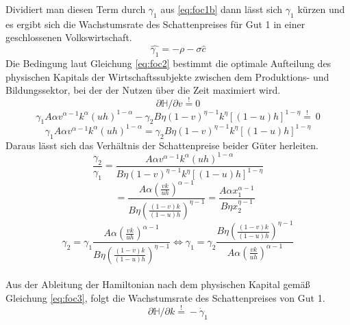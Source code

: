 Dividiert man diesen Term durch $\gamma_1$ aus \eqref{eq:foc1b} dann lässt sich $\gamma_1$ kürzen und es ergibt sich die Wachstumsrate des Schattenpreises für Gut 1 in einer geschlossenen Volkswirtschaft.
\begin{equation}
\hat{\gamma_1}=-\rho-\sigma\hat{c}\label{eq:foc1d}
\end{equation}
Die Bedingung laut Gleichung \eqref{eq:foc2} bestimmt die optimale Aufteilung des physischen Kapitals der Wirtschaftssubjekte zwischen dem Produktions- und Bildungssektor, bei der  der Nutzen über die Zeit maximiert wird.
\begin{equation*}
\partial\mathbb{H}/\partial v\overset{!}{=}0
\end{equation*}
\vspace{-0.2cm}
\begin{equation}
\gamma_1A\alpha v^{\alpha-1}k^\alpha(uh)^{1-\alpha}-\gamma_2B\eta(1-v)^{\eta-1}k^\eta[(1-u)h]^{1-\eta}\overset{!}{=}~0
\end{equation}
\vspace{-0.7cm}
\begin{equation}
\gamma_1A\alpha v^{\alpha-1}k^\alpha(uh)^{1-\alpha}=\gamma_2B\eta(1-v)^{\eta-1}k^\eta[(1-u)h]^{1-\eta}
\end{equation}
Daraus lässt sich das Verhältnis der Schattenpreise beider Güter herleiten.
\begin{equation}
\frac{\gamma_2}{\gamma_1}=\frac{A\alpha v^{\alpha-1}k^\alpha(uh)^{1-\alpha}}{B\eta(1-v)^{\eta-1}k^\eta[(1-u)h]^{1-\eta}}\label{Verhaltnisherleitung1WM}
\end{equation}
\begin{equation}
\quad ~~=\frac{A\alpha \left(\frac{vk}{uh}\right)^{\alpha-1}}{B\eta\left(\frac{(1-v)k}{(1-u)h}\right)^{\eta-1}}=\frac{A\alpha x_1^{\alpha-1}}{B\eta x_2^{\eta-1}}\label{Verhaltnisherleitung1aWM}
\end{equation}
\begin{equation}
\gamma_2=\gamma_1\frac{A\alpha \left(\frac{vk}{uh}\right)^{\alpha-1}}{B\eta\left(\frac{(1-v)k}{(1-u)h}\right)^{\eta-1}}\Longleftrightarrow \gamma_1=\gamma_2\frac{B\eta\left(\frac{(1-v)k}{(1-u)h}\right)^{\eta-1}}{A\alpha \left(\frac{vk}{uh}\right)^{\alpha-1}}\label{Verhaltnisherleitung2WM}
\end{equation}\\
Aus der Ableitung der Hamiltonian nach dem physischen Kapital gemä{\ss} Gleichung \eqref{eq:foc3}, folgt die Wachstumsrate des Schattenpreises von Gut 1.\newline
\begin{equation*}
\partial\mathbb{H}/\partial k\overset{!}{=}-\dot{\gamma}_1
\end{equation*}
